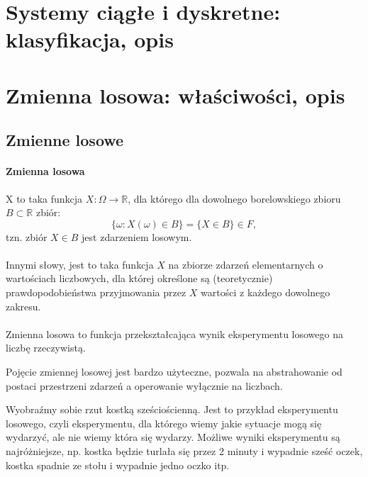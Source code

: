 \documentclass[a4paper,twoside]{report}
\begin{document}
\section{Systemy ciągłe i dyskretne: klasyfikacja, opis}
\section{Zmienna losowa: właściwości, opis}

\subsection{Zmienne losowe}

\paragraph{Zmienna losowa} X to taka funkcja $X : \Omega \longrightarrow \mathbb{R}$, dla którego dla dowolnego borelowskiego zbioru $B \subset \mathbb{R}$ zbiór:
\begin{equation}
\{\omega : X(\omega) \in B \} = \{X \in B\} \in F,
\end{equation}
tzn. zbiór $X \in B$ jest zdarzeniem losowym.\\\\
Innymi słowy, jest to taka funkcja $X$ na zbiorze zdarzeń elementarnych o wartościach liczbowych, dla której określone są (teoretycznie) prawdopodobieństwa przyjmowania przez $X$ wartości z każdego dowolnego zakresu.\\\\

Zmienna losowa to funkcja przekształcająca wynik eksperymentu losowego na liczbę rzeczywistą. 

Pojęcie zmiennej losowej jest bardzo użyteczne, pozwala na abstrahowanie od postaci przestrzeni zdarzeń a operowanie wyłącznie na liczbach. 

Wyobraźmy sobie rzut kostką sześciościenną. Jest to przykład eksperymentu losowego, czyli eksperymentu, dla którego wiemy jakie sytuacje mogą się wydarzyć, ale nie wiemy która się wydarzy. Możliwe wyniki eksperymentu są najróżniejsze, np. kostka będzie turlała się przez 2 minuty i wypadnie sześć oczek, kostka spadnie ze stołu i wypadnie jedno oczko itp. 
\end{document}

